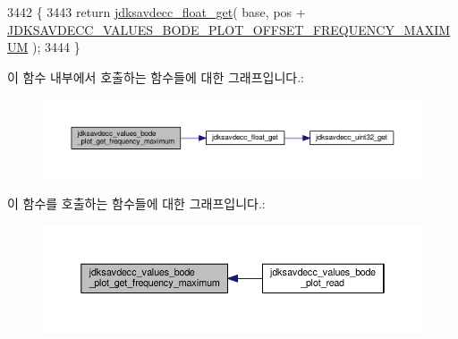 \begin{DoxyCode}
3442 \{
3443     \textcolor{keywordflow}{return} \hyperlink{group__endian_gadf6108d4d5f2936dd5018e4b80265c8c}{jdksavdecc\_float\_get}( base, pos + 
      \hyperlink{group__values__bode__plot_ga76f7a9b67510a9851d872236bdfd4316}{JDKSAVDECC\_VALUES\_BODE\_PLOT\_OFFSET\_FREQUENCY\_MAXIMUM} );
3444 \}
\end{DoxyCode}


이 함수 내부에서 호출하는 함수들에 대한 그래프입니다.\+:
\nopagebreak
\begin{figure}[H]
\begin{center}
\leavevmode
\includegraphics[width=350pt]{group__values__bode__plot_gaaba2c0b4015b8af9d1a1544b471ad8f8_cgraph}
\end{center}
\end{figure}




이 함수를 호출하는 함수들에 대한 그래프입니다.\+:
\nopagebreak
\begin{figure}[H]
\begin{center}
\leavevmode
\includegraphics[width=350pt]{group__values__bode__plot_gaaba2c0b4015b8af9d1a1544b471ad8f8_icgraph}
\end{center}
\end{figure}


